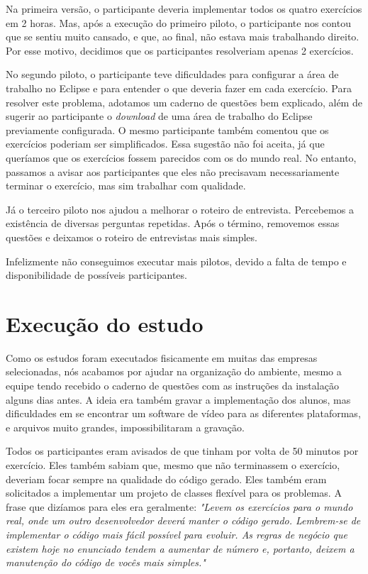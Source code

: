 Na primeira versão, o participante deveria implementar todos os quatro exercícios em 2 horas.
Mas, após a execução do primeiro piloto, o participante nos contou que se sentiu muito cansado, e
que, ao final, não estava mais trabalhando direito. Por esse motivo, decidimos que
os participantes resolveriam apenas 2 exercícios.

No segundo piloto, o participante teve dificuldades para configurar a área de trabalho no Eclipse e
para entender o que deveria fazer em cada exercício. Para resolver este problema, adotamos um 
caderno de questões bem explicado, além de sugerir ao participante o \textit{download} de uma
área de trabalho do Eclipse previamente configurada.
O mesmo participante também comentou que os exercícios poderiam ser simplificados. Essa sugestão
não foi aceita, já que queríamos que os exercícios fossem parecidos com os do mundo real. No entanto,
passamos a avisar aos participantes que eles não precisavam necessariamente terminar o exercício,
mas sim trabalhar com qualidade.

Já o terceiro piloto nos ajudou a melhorar o roteiro de entrevista. Percebemos a existência de diversas perguntas
repetidas. Após o término, removemos essas questões e deixamos o roteiro de entrevistas mais simples.

Infelizmente não conseguimos executar mais pilotos, devido a falta de
tempo e disponibilidade de possíveis participantes.

\section{Execução do estudo}
\label{subsec:particularidades-execucao}

Como os estudos foram executados fisicamente em muitas das empresas selecionadas,
nós acabamos por ajudar na organização do ambiente, mesmo a equipe tendo 
recebido o caderno de questões com as instruções da instalação
alguns dias antes. A ideia era também gravar a implementação dos alunos,
mas dificuldades em se encontrar um software de vídeo para as diferentes
plataformas, e arquivos muito grandes, impossibilitaram a gravação.

Todos os participantes eram avisados de que tinham por volta de 50 minutos
por exercício. Eles também sabiam que, mesmo que não terminassem o exercício,
deveriam focar sempre na qualidade do código gerado. Eles também eram solicitados
a implementar um projeto de classes flexível para os problemas. A frase que dizíamos para
eles era geralmente: \textit{"Levem os exercícios para o mundo real, onde um outro
desenvolvedor deverá manter o código gerado. Lembrem-se de implementar o código mais fácil possível
para evoluir. As regras de negócio que existem hoje no enunciado tendem a aumentar
de número e, portanto, deixem a manutenção do código de vocês mais simples."}

